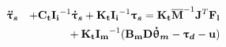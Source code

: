 \setlength{\arraycolsep}{0.0em}
\begin{eqnarray}
\label{eq:dynamics_eq2}
\vects{\ddot{\uptau}_s} && + \vectm{C_t I_i}^{-1} \vects{\dot{\uptau}_s} + \vectm{K_t I_i}^{-1} \vects{\uptau_s} =\vectm{K_t } \overline{\vectm{M}}^{-1} \vectm{ J}^T \vect{F_l}  \nonumber \\
&&{+}\:   \vectm{K_t   I_m}^{-1} ( \vectm{B_m D}\vects{\dot{\uptheta}_m}  -  \vects{\uptau_d} - \vect{u})
\end{eqnarray}
\setlength{\arraycolsep}{5pt}


